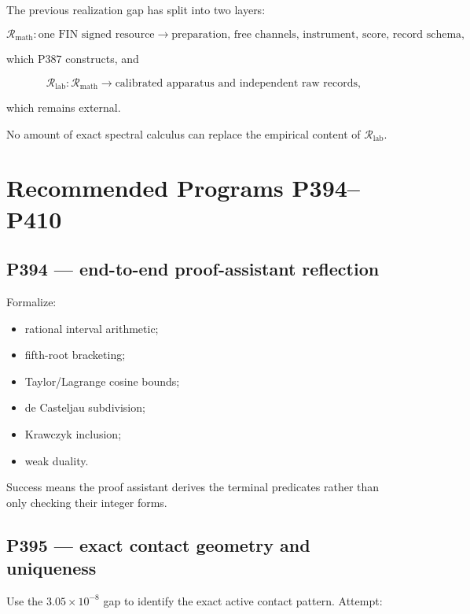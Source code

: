 \documentclass[11pt,a4paper,openany]{report}
\begin{document}
The previous realization gap has split into two layers:

\[
\mathcal R_{\mathrm{math}}
:
\text{one FIN signed resource}
\longrightarrow
\text{preparation, free channels, instrument, score, record schema},
\]

which P387 constructs, and

\[
\mathcal R_{\mathrm{lab}}
:
\mathcal R_{\mathrm{math}}
\longrightarrow
\text{calibrated apparatus and independent raw records},
\]

which remains external.

No amount of exact spectral calculus can replace the empirical content of \(\mathcal R_{\mathrm{lab}}\).

\chapter{Recommended Programs P394--P410}

\section{P394 --- end-to-end proof-assistant reflection}

Formalize:

\begin{itemize}
\item 
rational interval arithmetic;

\item 
fifth-root bracketing;

\item 
Taylor/\allowbreak{}Lagrange cosine bounds;

\item 
de Casteljau subdivision;

\item 
Krawczyk inclusion;

\item 
weak duality.

\end{itemize}

Success means the proof assistant derives the terminal predicates rather than only checking their integer forms.

\section{P395 --- exact contact geometry and uniqueness}

Use the \(3.05\times10^{-8}\) gap to identify the exact active contact pattern. Attempt:
\end{document}
